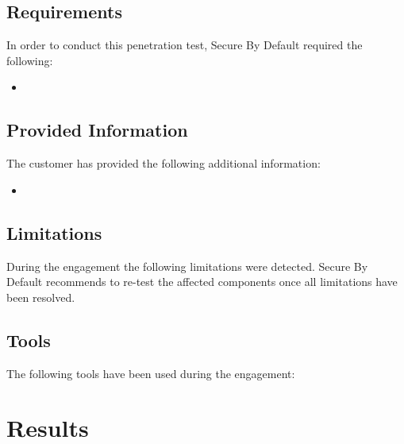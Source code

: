   \subsection{Requirements}

  In order to conduct this penetration test, Secure By Default required the following:

  \begin{itemize}
      \item {}
  \end{itemize}

  \subsection{Provided Information}

  The customer has provided the following additional information:

  \begin{itemize}
      \item {}
  \end{itemize}

  \subsection{Limitations}

  During the engagement the following limitations were detected.
  Secure By Default recommends to re-test the affected components once all limitations have been resolved.


\subsection{Tools}

The following tools have been used during the engagement:


\clearpage
\section{Results}
\label{sec:results}

